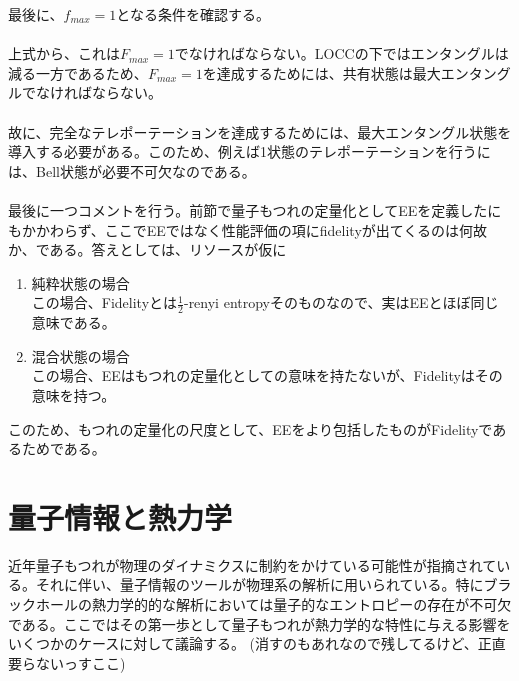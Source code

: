 \documentclass[a4paper,10.5pt]{article}
\numberwithin{equation}{section}
\begin{document}
最後に、$f_{max}=1$となる条件を確認する。\\
\\
上式から、これは$F_{max}=1$でなければならない。LOCCの下ではエンタングルは減る一方であるため、$F_{max}=1$を達成するためには、共有状態は最大エンタングルでなければならない。\\
\\
故に、完全なテレポーテーションを達成するためには、最大エンタングル状態を導入する必要がある。このため、例えば1状態のテレポーテーションを行うには、Bell状態が必要不可欠なのである。\\
\\
最後に一つコメントを行う。前節で量子もつれの定量化としてEEを定義したにもかかわらず、ここでEEではなく性能評価の項にfidelityが出てくるのは何故か、である。答えとしては、リソースが仮に
\begin{enumerate}
    \item 純粋状態の場合\\
    この場合、Fidelityとは$\frac{1}{2}$-renyi entropyそのものなので、実はEEとほぼ同じ意味である。
    \item 混合状態の場合\\
    この場合、EEはもつれの定量化としての意味を持たないが、Fidelityはその意味を持つ。
\end{enumerate}
このため、もつれの定量化の尺度として、EEをより包括したものがFidelityであるためである。

\section{量子情報と熱力学}
近年量子もつれが物理のダイナミクスに制約をかけている可能性が指摘されている。それに伴い、量子情報のツールが物理系の解析に用いられている。特にブラックホールの熱力学的的な解析においては量子的なエントロピーの存在が不可欠である。ここではその第一歩として量子もつれが熱力学的な特性に与える影響をいくつかのケースに対して議論する。
(消すのもあれなので残してるけど、正直要らないっすここ)
\end{document}
